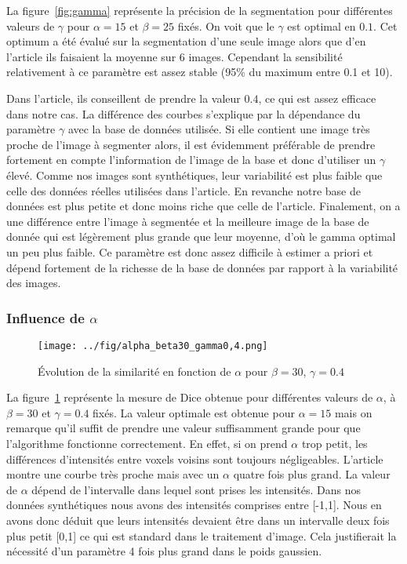 \documentclass{article}
\begin{document}
La figure~\ref{fig:gamma} représente la précision de la segmentation pour différentes valeurs de $\gamma$ pour $\alpha=15$ et $\beta=25$ fixés. On voit que le $\gamma$ est optimal en $0.1$. Cet optimum a été évalué sur la segmentation d’une seule image alors que d’en l’article ils faisaient la moyenne sur 6 images. Cependant la sensibilité relativement à ce paramètre est assez stable (95\% du maximum entre 0.1 et 10). 

Dans l’article, ils conseillent de prendre la valeur $0.4$, ce qui est assez efficace dans notre cas. La différence des courbes s’explique par la dépendance du paramètre $\gamma$  avec la base de données utilisée. Si elle contient une image très proche de l’image à segmenter alors, il est évidemment préférable de prendre fortement en compte l’information de l’image de la base et donc d’utiliser un $\gamma$ élevé. Comme nos images sont synthétiques, leur variabilité est plus faible que celle des données réelles utilisées dans l’article.  En revanche notre base de données est plus petite et donc moins riche que celle de l’article. Finalement, on a une différence entre l’image à segmentée et la meilleure image de la base de donnée qui est légèrement plus grande que leur moyenne, d’où le gamma optimal un peu plus faible. Ce paramètre est donc assez difficile à estimer a priori et dépend fortement de la richesse de la base de données par rapport à la variabilité des images.


\subsubsection{Influence de $\alpha$}


\begin{figure}[h!]
  \begin{center}
    \caption{Évolution de la similarité en fonction de $\alpha$ pour  $\beta=30$, $\gamma=0.4$}
    \texttt{[image: ../fig/alpha\_beta30\_gamma0,4.png]}
    \label{fig:alpha}
  \end{center}
\end{figure}


La figure~\ref{fig:alpha} représente la mesure de Dice obtenue pour différentes valeurs de $\alpha$, à $\beta=30$ et $\gamma=0.4$ fixés. La valeur optimale est obtenue pour $\alpha=15$ mais on remarque qu’il suffit de prendre une valeur suffisamment grande pour que l’algorithme fonctionne correctement. En effet, si on prend $\alpha$ trop petit, les différences d'intensités entre voxels voisins sont toujours négligeables. L’article montre une courbe très proche mais avec un $\alpha$ quatre fois plus grand. La valeur de $\alpha$ dépend de l’intervalle dans lequel sont prises les intensités. Dans nos données synthétiques nous avons des intensités comprises entre [-1,1]. Nous en avons donc déduit que leurs intensités devaient être dans un intervalle deux fois plus petit [0,1] ce qui est standard dans le traitement d’image. Cela justifierait la nécessité d’un paramètre 4 fois plus grand dans le poids gaussien.
\end{document}
